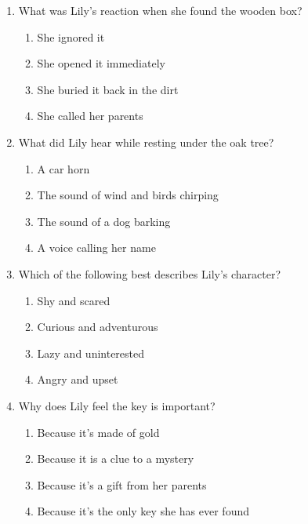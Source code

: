 \documentclass[12pt]{article}
\begin{document}
\begin{enumerate}
    \item What was Lily’s reaction when she found the wooden box?
    \begin{enumerate}[label=\Alph*.]
        \item She ignored it
        \item She opened it immediately
        \item She buried it back in the dirt
        \item She called her parents
    \end{enumerate}
    \vspace{0.5cm}

    \item What did Lily hear while resting under the oak tree?
    \begin{enumerate}[label=\Alph*.]
        \item A car horn
        \item The sound of wind and birds chirping
        \item The sound of a dog barking
        \item A voice calling her name
    \end{enumerate}
    \vspace{0.5cm}

\vspace{1cm}
    \item Which of the following best describes Lily’s character?
    \begin{enumerate}[label=\Alph*.]
        \item Shy and scared
        \item Curious and adventurous
        \item Lazy and uninterested
        \item Angry and upset
    \end{enumerate}
    \vspace{0.5cm}

    \item Why does Lily feel the key is important?
    \begin{enumerate}[label=\Alph*.]
        \item Because it’s made of gold
        \item Because it is a clue to a mystery
        \item Because it’s a gift from her parents
        \item Because it’s the only key she has ever found
    \end{enumerate}
    \vspace{0.5cm}


\end{enumerate}
\end{document}
